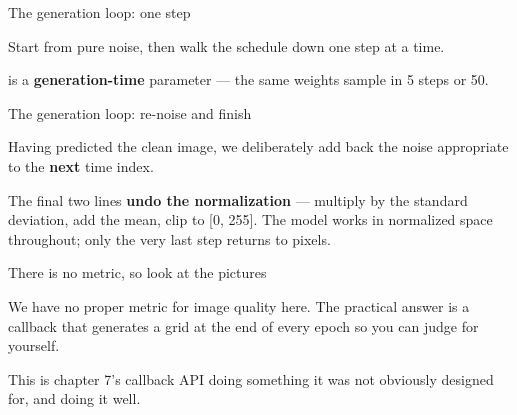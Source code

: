 \documentclass[aspectratio=169,11pt,t]{beamer}
\begin{document}
\begin{frame}[shrink=25]{The generation loop: one step}
{\fontsize{9.4}{12.6}\selectfont\color{fg2}Start from pure noise, then walk the schedule down one step at a time.\par}\vskip 4pt
{\fontsize{9.4}{12.6}\selectfont\color{fg2} is a \textbf{generation-time} parameter --- the same weights sample in 5 steps or 50.\par}\vskip 4pt
\end{frame}

\begin{frame}[shrink=25]{The generation loop: re-noise and finish}
{\fontsize{9.4}{12.6}\selectfont\color{fg2}Having predicted the clean image, we deliberately add back the noise appropriate to the \textbf{next} time index.\par}\vskip 4pt
{\fontsize{9.4}{12.6}\selectfont\color{fg2}The final two lines \textbf{undo the normalization} --- multiply by the standard deviation, add the mean, clip to [0, 255]. The model works in normalized space throughout; only the very last step returns to pixels.\par}\vskip 4pt
\end{frame}

\begin{frame}[shrink=25]{There is no metric, so look at the pictures}
{\fontsize{9.4}{12.6}\selectfont\color{fg2}We have no proper metric for image quality here. The practical answer is a callback that generates a grid at the end of every epoch so you can judge for yourself.\par}\vskip 4pt
{\fontsize{9.4}{12.6}\selectfont\color{fg2}This is chapter 7's callback API doing something it was not obviously designed for, and doing it well.\par}\vskip 4pt
\end{frame}
\end{document}
